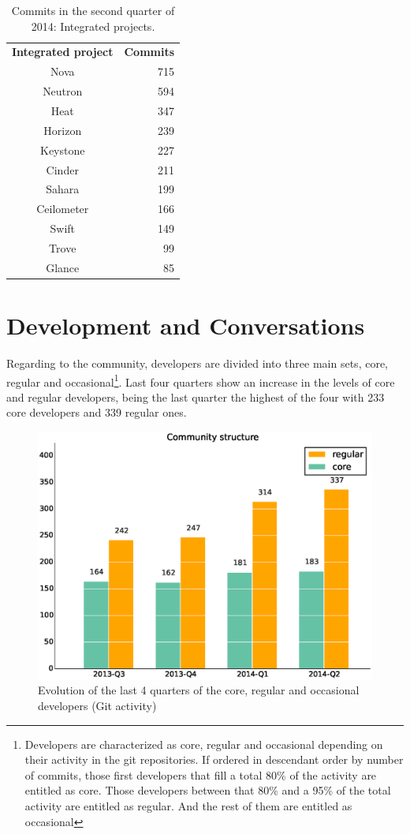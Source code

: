 \documentclass[a4wide,11pt]{report}
\begin{document}
\begin{table}[H]
\centering
\begin{tabular}{c|r|} 

\textbf{Integrated project} & \textbf{Commits} \\
Nova & 715\\
Neutron & 594\\
Heat & 347\\
Horizon & 239\\
Keystone & 227\\
Cinder & 211\\
Sahara & 199\\
Ceilometer & 166\\
Swift & 149\\
Trove & 99\\
Glance & 85\\
\end{tabular}
\caption{Commits in the second quarter of 2014: Integrated projects.}
\end{table}



\section{Development and Conversations}

Regarding to the community, developers are divided into three main sets, core, regular and occasional\footnote{Developers are characterized as core, regular and occasional depending on their activity in the git repositories. If ordered in descendant order by number of commits, those first developers that fill a total 80\% of the activity are entitled as core. Those developers between that 80\% and a 95\% of the total activity are entitled as regular. And the rest of them are entitled as occasional}. Last four quarters show an increase in the levels of core and regular developers, being the last quarter the highest of the four with 233 core developers and 339 regular ones.


\begin{figure}[H]
    \centering
    \includegraphics[scale=.35]{figs/onion.eps}
    \caption{Evolution of the last 4 quarters of the core, regular and occasional developers (Git activity)}
\end{figure}
\end{document}
